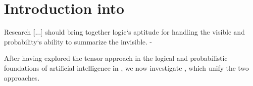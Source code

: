 \chapter{Introduction into }

\begin{highlight}
	Research [...] should bring together logic`s aptitude for handling the visible and probability`s ability to summarize the invisible. - 
\end{highlight}

After having explored the tensor approach in the logical and probabilistic foundations of artificial intelligence in , we now investigate \HybridLogicNetworks{}, which unify the two approaches.



